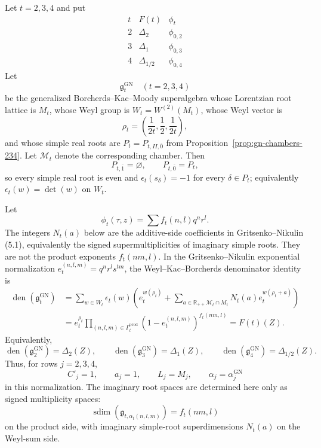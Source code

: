 \documentclass[11pt]{memoir}
\newcommand{\R}{\mathbb{R}} \newcommand{\La}{\Lambda}
\newcommand{\sdim}{\operatorname{sdim}}
\begin{document}
\begin{theorem}
\label{thm:gn-denominator-234}
Let $t=2,3,4$ and put
$$
\begin{array}{c|c|c}
t&F(t)&\phi_t\\ \hline
2&\Delta_2&\phi_{0,2}\\
3&\Delta_1&\phi_{0,3}\\
4&\Delta_{1/2}&\phi_{0,4}
\end{array}
$$
Let
$$
\mathfrak g_t^{\mathrm{GN}}
\quad (t=2,3,4)
$$
be the generalized Borcherds--Kac--Moody superalgebra whose Lorentzian
root lattice is $M_t$, whose Weyl group is
$W_t=W^{(2)}(M_t)$, whose Weyl vector is
$$
\rho_t=\left(\frac{1}{2t},\frac12,\frac{1}{2t}\right),
$$
and whose simple real roots are $P_t=P_{t,II,\overline0}$ from
Proposition~\ref{prop:gn-chambers-234}.  Let $\mathcal M_t$ denote
the corresponding chamber.  Then
$$
P_{t,\overline1}=\varnothing,\qquad P_{t,\overline0}=P_t,
$$
so every simple real root is even and
$\epsilon_t(s_\delta)=-1$ for every $\delta\in P_t$; equivalently
$\epsilon_t(w)=\det(w)$ on $W_t$.

Let
$$
\phi_t(\tau,z)=\sum f_t(n,l)q^nr^l .
$$
The integers \(N_t(a)\) below are the additive-side coefficients in
Gritsenko--Nikulin (5.1), equivalently the signed supermultiplicities of
imaginary simple roots.  They are not the product exponents \(f_t(nm,l)\).
In the Gritsenko--Nikulin exponential normalization
$e_t^{(n,l,m)}=q^nr^ls^{tm}$, the Weyl--Kac--Borcherds denominator
identity is
$$
\begin{aligned}
\operatorname{den}(\mathfrak g_t^{\mathrm{GN}})
&=\sum_{w\in W_t}\epsilon_t(w)
 \left(e_t^{w(\rho_t)}
 +\sum_{a\in\R_{++}\mathcal M_t\cap M_t}
 N_t(a)e_t^{w(\rho_t+a)}\right)\\
&=e_t^{\rho_t}
\prod_{(n,l,m)\in\Gamma_t^{\mathrm{prod}}}
\left(1-e_t^{(n,l,m)}\right)^{f_t(nm,l)}
=F(t)(Z).
\end{aligned}
$$
Equivalently,
$$
\operatorname{den}(\mathfrak g_2^{\mathrm{GN}})=\Delta_2(Z),\qquad
\operatorname{den}(\mathfrak g_3^{\mathrm{GN}})=\Delta_1(Z),\qquad
\operatorname{den}(\mathfrak g_4^{\mathrm{GN}})=\Delta_{1/2}(Z).
$$
Thus, for rows $j=2,3,4$,
$$
C'_j=1,\qquad a_j=1,\qquad
L_j=M_j,\qquad \alpha_j=\alpha_j^{\mathrm{GN}}
$$
in this normalization.  The imaginary root spaces are determined here
only as signed multiplicity spaces:
$$
\sdim(\mathfrak g_{t,\alpha_t(n,l,m)})
=f_t(nm,l)
$$
on the product side, with imaginary simple-root superdimensions
$N_t(a)$ on the Weyl-sum side.
\end{theorem}
\end{document}
